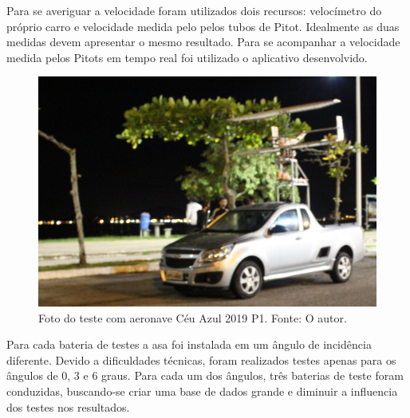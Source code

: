 Para se averiguar a velocidade foram utilizados dois recursos: velocímetro do próprio carro e velocidade medida pelo pelos tubos de Pitot. Idealmente as duas medidas devem apresentar o mesmo resultado. Para se acompanhar a velocidade medida pelos Pitots em tempo real foi utilizado o aplicativo desenvolvido.

\begin{figure}[!ht]
    \centering
    \includegraphics[width=.5\linewidth]{figuras/testes/teste_aviao_completo.JPG}
    \caption{Foto do teste com aeronave Céu Azul 2019 P1. Fonte: O autor.}
    \label{fig:foto_teste_aviao}
\end{figure}

Para cada bateria de testes a asa foi instalada em um ângulo de incidência diferente. Devido a dificuldades técnicas, foram realizados testes apenas para os ângulos de 0, 3 e 6 graus. Para cada um dos ângulos, três baterias de teste foram conduzidas, buscando-se criar uma base de dados grande e diminuir a influencia dos testes nos resultados.

